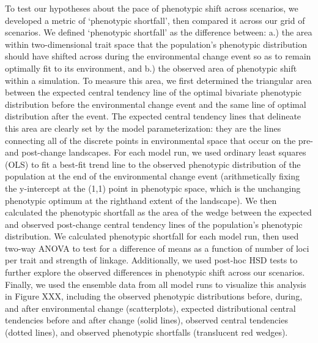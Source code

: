 \documentclass[9pt,twocolumn,twoside,lineno]{pnas-new}
\begin{document}
{To test our hypotheses about the pace of phenotypic shift across scenarios, we 
developed a metric of ‘phenotypic shortfall’, then compared it across our grid of 
scenarios. We defined ‘phenotypic shortfall’ as the difference between: a.) the area 
within two-dimensional trait space that the population’s phenotypic distribution 
should have shifted across during the environmental change event so as to remain 
optimally fit to its environment, and b.) the observed area of phenotypic shift within
a simulation. To measure this area, we first determined the triangular area between 
the expected central tendency line of the optimal bivariate phenotypic distribution 
before the environmental change event and the same line of optimal distribution after 
the event. The expected central tendency lines that delineate this area are clearly 
set by the model parameterization: they are the lines connecting all of the discrete 
points in environmental space that occur on the pre- and post-change landscapes. For 
each model run, we used ordinary least squares (OLS) to fit a best-fit trend line to 
the observed phenotypic distribution of the population at the end of the environmental
change event (arithmetically fixing the y-intercept at the (1,1) point in phenotypic 
space, which is the unchanging phenotypic optimum at the righthand extent of the 
landscape). We then calculated the phenotypic shortfall as the area of the wedge 
between the expected and observed post-change central tendency lines of the 
population’s phenotypic distribution. We calculated phenotypic shortfall for each 
model run, then used two-way ANOVA to test for a difference of means as a function of 
number of loci per trait and strength of linkage. Additionally, we used post-hoc HSD 
tests to further explore the observed differences in phenotypic shift across our 
scenarios. Finally, we used the ensemble data from all model runs to visualize this 
analysis in Figure XXX, including the observed phenotypic distributions before, 
during, and after environmental change (scatterplots), expected distributional central
tendencies before and after change (solid lines), observed central tendencies (dotted 
lines), and observed phenotypic shortfalls (translucent red wedges).
	

}
\end{document}
